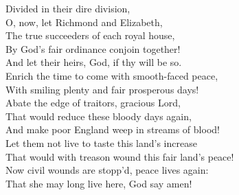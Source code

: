 \documentclass{article}
\begin{document}
\begin{description}
\hspace{1pt}Divided in their dire division,\\
\hspace{1pt}O, now, let Richmond and Elizabeth,\\
\hspace{1pt}The true succeeders of each royal house,\\
\hspace{1pt}By God's fair ordinance conjoin together!\\
\hspace{1pt}And let their heirs, God, if thy will be so.\\
\hspace{1pt}Enrich the time to come with smooth-faced peace,\\
\hspace{1pt}With smiling plenty and fair prosperous days!\\
\hspace{1pt}Abate the edge of traitors, gracious Lord,\\
\hspace{1pt}That would reduce these bloody days again,\\
\hspace{1pt}And make poor England weep in streams of blood!\\
\hspace{1pt}Let them not live to taste this land's increase\\
\hspace{1pt}That would with treason wound this fair land's peace!\\
\hspace{1pt}Now civil wounds are stopp'd, peace lives again:\\
\hspace{1pt}That she may long live here, God say amen!\\
\end{description}
\centering{\it [Exeunt]}\\
\end{document}

